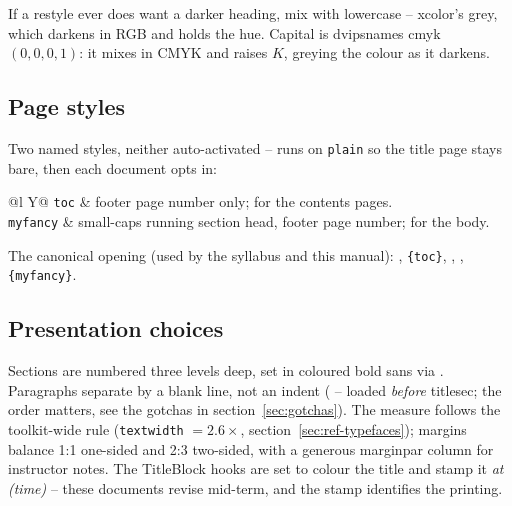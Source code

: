 If a restyle ever does want a darker heading, mix with lowercase
 -- xcolor's grey, which darkens in RGB and holds the hue.
Capital  is dvipsnames cmyk $(0,0,0,1)$: it mixes in CMYK and
raises $K$, greying the colour as it darkens.

\subsection*{Page styles}

Two named styles, neither auto-activated --  runs on
\texttt{plain} so the title page stays bare, then each document opts in:

\begin{center}
\begin{tabularx}{\linewidth}{@{}l Y@{}}
\texttt{toc} & footer page number only; for the contents pages.\\
\texttt{myfancy} & small-caps running section head, footer page number;
  for the body.\\
\end{tabularx}
\end{center}

The canonical opening (used by the syllabus and this manual):
, \texttt{\{toc\}}, ,
, \texttt{\{myfancy\}}.

\subsection*{Presentation choices}

Sections are numbered three levels deep, set in coloured bold sans via
. Paragraphs separate by a blank line, not an indent
( -- loaded \emph{before} titlesec; the order matters, see
the gotchas in section~\ref{sec:gotchas}). The measure follows the
toolkit-wide rule (\texttt{textwidth} $= 2.6\times$,
section~\ref{sec:ref-typefaces}); margins balance 1:1 one-sided and 2:3
two-sided, with a generous marginpar column for instructor notes. The
TitleBlock hooks are set to colour the title and stamp it \emph{at (time)} --
these documents revise mid-term, and the stamp identifies the printing.
